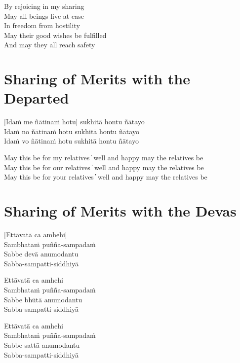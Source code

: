 \begin{cprenglish}
  By rejoicing in my sharing\\
  May all beings live at ease\\
  In freedom from hostility\\
  May their good wishes be fulfilled\\
  And may they all reach safety
\end{cprenglish}

\suttaRef{[Thai]}

\clearpage

\section{Sharing of Merits with the Departed}

[Idaṁ me ñātinaṁ hotu] sukhitā hontu ñātayo\\
Idaṁ no ñātinaṁ hotu sukhitā hontu ñātayo\\
Idaṁ vo ñātinaṁ hotu sukhitā hontu ñātayo

\begin{cprenglish}
  May this be for my relatives  ̓  well and happy may the relatives be\\
  May this be for our relatives  ̓  well and happy may the relatives be\\
  May this be for your relatives  ̓  well and happy may the relatives be
\end{cprenglish}

\suttaRef{[Thai]}

\clearpage

\section{Sharing of Merits with the Devas}

[Ettāvatā ca amhehi]\\
Sambhataṁ puñña-sampadaṁ\\
Sabbe devā anumodantu\\
Sabba-sampatti-siddhiyā

Ettāvatā ca amhehi\\
Sambhataṁ puñña-sampadaṁ\\
Sabbe bhūtā anumodantu\\
Sabba-sampatti-siddhiyā

Ettāvatā ca amhehi\\
Sambhataṁ puñña-sampadaṁ\\
Sabbe sattā anumodantu\\
Sabba-sampatti-siddhiyā

